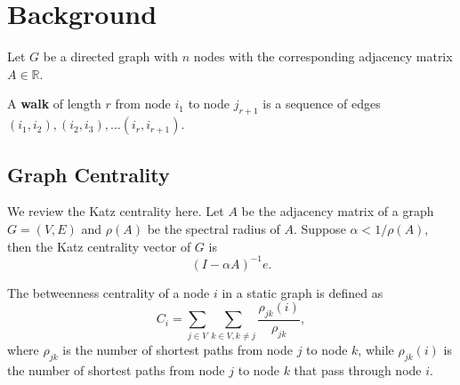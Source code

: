 \documentclass[12pt]{article}
\theoremstyle{definition}
\def\R{\mathbb{R}}
\begin{document}
\section{Background}
\label{sec:preliminaries}

Let $G$ be a directed graph with $n$ nodes with the corresponding adjacency matrix 
$A \in \R$. 

A \textbf{walk} of length $r$ from node $i_1$ to node $j_{r+1}$ is a sequence of edges
$(i_1, i_2), (i_2, i_3), \ldots (i_r, i_{r+1})$.


\subsection{Graph Centrality}
\label{sec:katz-centrality}

We review the Katz centrality here.
Let $A$ be the adjacency matrix of a graph $G=(V,E)$ and $\rho(A)$ be the spectral radius of $A$. Suppose $\alpha < 1/ \rho(A)$, then the Katz centrality vector of $G$ is
\[
(I - \alpha A)^{-1}e.
\]

The betweenness centrality of a node $i$ in a static graph is defined as
$$
C_i = \sum_{j \in V}\sum_{k \in V, k \ne j} \frac{\rho_{jk}(i)}{\rho_{jk}},
$$
where $\rho_{jk}$ is the number of shortest paths from node $j$ to node $k$, while $\rho_{jk}(i)$ is the number of shortest paths from node $j$ to node $k$ that pass through node $i$.




\end{document}
